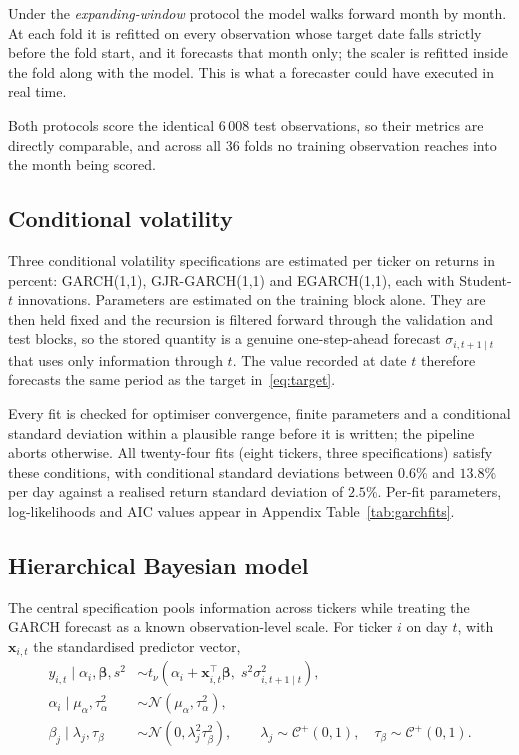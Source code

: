 Under the \emph{expanding-window} protocol the model walks forward month by
month. At each fold it is refitted on every observation whose target date falls
strictly before the fold start, and it forecasts that month only; the scaler is
refitted inside the fold along with the model. This is what a forecaster could
have executed in real time.

Both protocols score the identical 6\,008 test observations, so their metrics
are directly comparable, and across all 36 folds no training observation reaches
into the month being scored.

\subsection{Conditional volatility}
\label{sec:garch}

Three conditional volatility specifications are estimated per ticker on returns
in percent: GARCH(1,1), GJR-GARCH(1,1) and EGARCH(1,1), each with Student-$t$
innovations. Parameters are estimated on the training block alone. They are then
held fixed and the recursion is filtered forward through the validation and test
blocks, so the stored quantity is a genuine one-step-ahead forecast
$\sigma_{i,t+1\mid t}$ that uses only information through $t$. The value recorded
at date $t$ therefore forecasts the same period as the target
in~\eqref{eq:target}.

Every fit is checked for optimiser convergence, finite parameters and a
conditional standard deviation within a plausible range before it is written;
the pipeline aborts otherwise. All twenty-four fits (eight tickers, three
specifications) satisfy these conditions, with conditional standard deviations
between $0.6\%$ and $13.8\%$ per day against a realised return standard
deviation of $2.5\%$. Per-fit parameters, log-likelihoods and AIC values appear
in Appendix Table~\ref{tab:garchfits}.

\subsection{Hierarchical Bayesian model}
\label{sec:bayes}

The central specification pools information across tickers while treating the
GARCH forecast as a known observation-level scale. For ticker $i$ on day $t$,
with $\mathbf{x}_{i,t}$ the standardised predictor vector,
\begin{align}
  y_{i,t} \mid \alpha_i, \boldsymbol\beta, s^2
    &\sim t_\nu\!\left(\alpha_i + \mathbf{x}_{i,t}^{\top}\boldsymbol\beta,\;
                        s^2\sigma_{i,t+1\mid t}^{2}\right),
    \label{eq:likelihood}\\
  \alpha_i \mid \mu_\alpha, \tau_\alpha^2 &\sim \mathcal{N}(\mu_\alpha, \tau_\alpha^2),
    \label{eq:pooling}\\
  \beta_j \mid \lambda_j, \tau_\beta &\sim \mathcal{N}(0, \lambda_j^2\tau_\beta^2),
  \qquad \lambda_j \sim \mathcal{C}^{+}(0,1), \quad \tau_\beta \sim \mathcal{C}^{+}(0,1).
    \label{eq:horseshoe}
\end{align}

